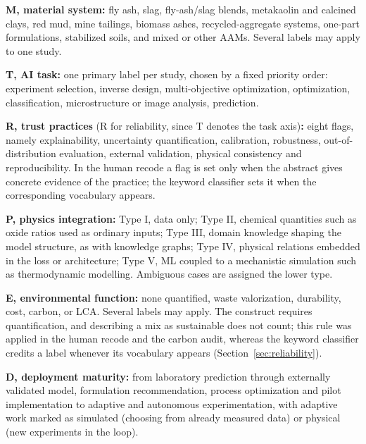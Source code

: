 \documentclass[pdflatex,sn-basic]{sn-jnl}
\begin{document}
\textbf{M, material system:} fly ash, slag, fly-ash/slag blends, metakaolin and calcined clays, red mud, mine tailings, biomass ashes, recycled-aggregate systems, one-part formulations, stabilized soils, and mixed or other AAMs. Several labels may apply to one study.

\textbf{T, AI task:} one primary label per study, chosen by a fixed priority order: experiment selection, inverse design, multi-objective optimization, optimization, classification, microstructure or image analysis, prediction.

\textbf{R, trust practices} (R for reliability, since T denotes the task axis)\textbf{:} eight flags, namely explainability, uncertainty quantification, calibration, robustness, out-of-distribution evaluation, external validation, physical consistency and reproducibility. In the human recode a flag is set only when the abstract gives concrete evidence of the practice; the keyword classifier sets it when the corresponding vocabulary appears.

\textbf{P, physics integration:} Type I, data only; Type II, chemical quantities such as oxide ratios used as ordinary inputs; Type III, domain knowledge shaping the model structure, as with knowledge graphs; Type IV, physical relations embedded in the loss or architecture; Type V, ML coupled to a mechanistic simulation such as thermodynamic modelling. Ambiguous cases are assigned the lower type.

\textbf{E, environmental function:} none quantified, waste valorization, durability, cost, carbon, or LCA. Several labels may apply. The construct requires quantification, and describing a mix as sustainable does not count; this rule was applied in the human recode and the carbon audit, whereas the keyword classifier credits a label whenever its vocabulary appears (Section~\ref{sec:reliability}).

\textbf{D, deployment maturity:} from laboratory prediction through externally validated model, formulation recommendation, process optimization and pilot implementation to adaptive and autonomous experimentation, with adaptive work marked as simulated (choosing from already measured data) or physical (new experiments in the loop).
\end{document}
